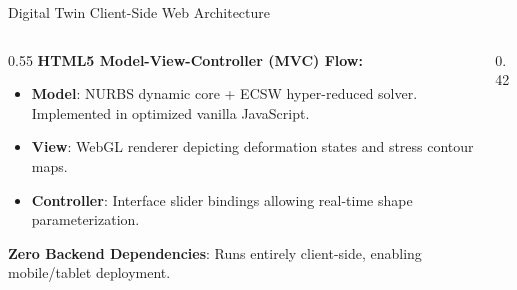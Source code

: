 \documentclass[aspectratio=169, 10pt]{beamer}
\begin{document}
\begin{frame}{Digital Twin Client-Side Web Architecture}
    \begin{columns}
        \begin{column}{0.55\textwidth}
            \textbf{HTML5 Model-View-Controller (MVC) Flow:}
            \begin{itemize}
                \item \textbf{Model}: NURBS dynamic core + ECSW hyper-reduced solver. Implemented in optimized vanilla JavaScript.
                \item \textbf{View}: WebGL renderer depicting deformation states and stress contour maps.
                \item \textbf{Controller}: Interface slider bindings allowing real-time shape parameterization.
            \end{itemize}
            \vspace{0.2cm}
            \textbf{Zero Backend Dependencies}: Runs entirely client-side, enabling mobile/tablet deployment.
        \end{column}
        \begin{column}{0.42\textwidth}
            \centering
        \end{column}
    \end{columns}
\end{frame}
\end{document}
